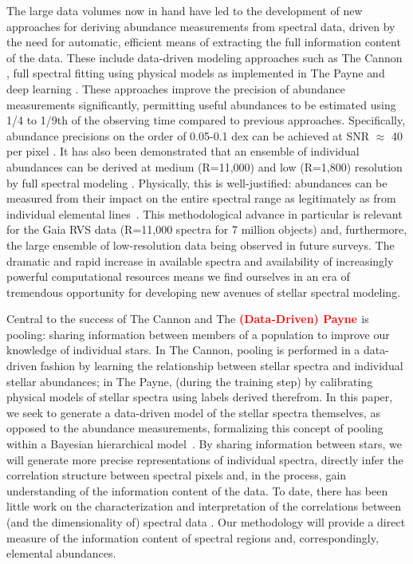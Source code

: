 \documentclass[a4paper,fleqn,usenatbib]{mnras}
\newcommand\edit[1]{\textcolor{red}{\textbf{#1}}}
\begin{document}
The large data volumes now in hand have led to the development of new approaches for deriving abundance measurements from spectral data, driven by the need for automatic, efficient means of extracting the full information content of the data. These include data-driven modeling approaches such as The Cannon \citep{Ness2015}, full spectral fitting using physical models as implemented in The Payne \citep{Ting2018} and  deep learning \citep{Leung2019}. These approaches improve the precision of abundance measurements significantly, permitting useful abundances to be estimated using 1/4 to 1/9th of the observing time compared to previous approaches. Specifically, abundance precisions on the order of 0.05-0.1 dex can be achieved at SNR $\approx$ 40 per pixel \citep{Ho2017b,Ness2018,Ting2018, Leung2019}. It has also been demonstrated that an ensemble of individual abundances can be derived at medium (R=11,000) and low (R=1,800) resolution by full spectral modeling \citep[e.g.][and Wheeler et al., in prep.]{Casey2016,Ting2017}. Physically, this is well-justified: abundances can be measured from their impact on the entire spectral range as legitimately as from individual elemental lines~\citep[e.g.][]{Ting2018}. This methodological advance in particular is relevant for the Gaia RVS data (R=11,000 spectra for 7 million objects) and, furthermore, the large ensemble of low-resolution data being observed in future surveys. The dramatic and rapid increase in available spectra and availability of increasingly powerful computational resources means we find ourselves in an era of tremendous opportunity for developing new avenues of stellar spectral modeling.

Central to the success of The Cannon and The \edit{(Data-Driven) Payne \citep{Xiang2019} } is pooling: sharing information between members of a population to improve our knowledge of individual stars. In The Cannon, pooling is performed in a data-driven fashion by learning the relationship between stellar spectra and individual stellar abundances; in The Payne, (during the training step) by calibrating physical models of stellar spectra using labels derived therefrom. In this paper, we seek to generate a data-driven model of the stellar spectra themselves, as opposed to the abundance measurements, formalizing this concept of pooling within a Bayesian hierarchical model~\edit{\citep{Gelman_etal:2013}}. By sharing information between stars, we will generate more precise representations of individual spectra, directly infer the correlation structure between spectral pixels and, in the process, gain understanding of the information content of the data. To date, there has been little work on the characterization and interpretation of the correlations between (and the dimensionality of) spectral data \citep[see however][]{Ting2012, PJ2019, M2014, Casey2019}. Our methodology will provide a direct measure of the information content of spectral regions and, correspondingly, elemental abundances.
 
\end{document}
